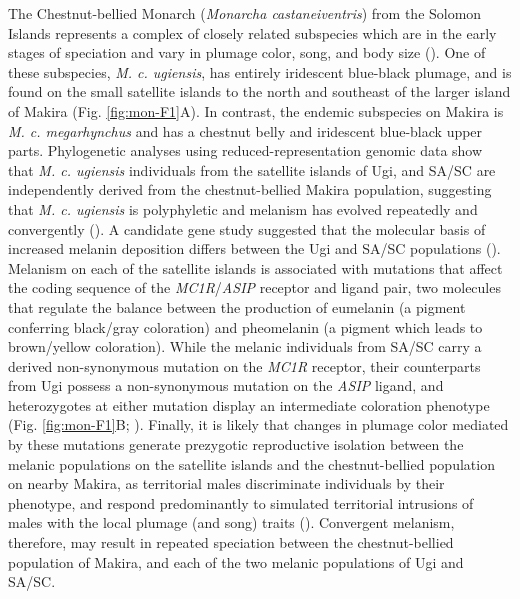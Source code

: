 The Chestnut-bellied Monarch (\textit{Monarcha castaneiventris}) from the Solomon Islands represents a complex of closely related subspecies which are in the early stages of speciation and vary in plumage color, song, and body size (\cite{mayr1999systematics,mayr2001birds,uy2009plumage}). One of these subspecies, \textit{M. c. ugiensis}, has entirely iridescent blue-black plumage, and is found on the small satellite islands to the north and southeast of the larger island of Makira (Fig. \ref{fig:mon-F1}A). In contrast, the endemic subspecies on Makira is \textit{M. c. megarhynchus} and has a chestnut belly and iridescent blue-black upper parts. Phylogenetic analyses using reduced-representation genomic data show that \textit{M. c. ugiensis} individuals from the satellite islands of Ugi, and \acf{SA/SC} are independently derived from the chestnut-bellied Makira population, suggesting that \textit{M. c. ugiensis} is polyphyletic and melanism has evolved repeatedly and convergently (\cite{cooper2017genomic}). A candidate gene study suggested that the molecular basis of increased melanin deposition differs between the Ugi and \ac{SA/SC} populations (\cite{uy2016mutations}). Melanism on each of the satellite islands is associated with mutations that affect the coding sequence of the \textit{MC1R}/\textit{ASIP} receptor and ligand pair, two molecules that regulate the balance between the production of eumelanin (a pigment conferring black/gray coloration) and pheomelanin (a pigment which leads to brown/yellow coloration). While the melanic individuals from \ac{SA/SC} carry a derived non-synonymous mutation on the \textit{MC1R} receptor, their counterparts from Ugi possess a non-synonymous mutation on the \textit{ASIP} ligand, and heterozygotes at either mutation display an intermediate coloration phenotype (Fig. \ref{fig:mon-F1}B; \cite{uy2016mutations}). Finally, it is likely that changes in plumage color mediated by these mutations generate prezygotic reproductive isolation between the melanic populations on the satellite islands and the chestnut-bellied population on nearby Makira, as territorial males discriminate individuals by their phenotype, and respond predominantly to simulated territorial intrusions of males with the local plumage (and song) traits (\cite{uy2009difference,uy2013variation}). Convergent melanism, therefore, may result in repeated speciation between the chestnut-bellied population of Makira, and each of the two melanic populations of Ugi and \ac{SA/SC}.

